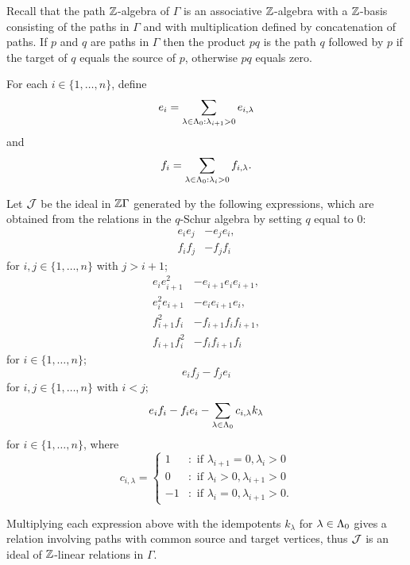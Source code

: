 \documentclass[a4paper, 11pt]{report}
\begin{document}
Recall that the path $\mathbb{Z}$-algebra of $\Gamma$ is an associative $\mathbb{Z}$-algebra with a $\mathbb{Z}$-basis consisting of the paths in $\Gamma$ and with multiplication defined by concatenation of paths. If $p$ and $q$ are paths in $\Gamma$ then the product $pq$ is the path $q$ followed by $p$ if the target of $q$ equals the source of $p$, otherwise $pq$ equals zero.

For each $i\in\{1,\ldots,n\}$, define
\begin{equation*}
e_i = \sum_{\lambda\in\Lambda_0{}:\lambda_{i+1}>0} e_{i,\lambda}
\end{equation*}
and
\begin{equation*}
f_i = \sum_{\lambda\in\Lambda_0{}:\lambda_i>0} f_{i,\lambda}.
\end{equation*}

Let $\mathcal{J}$ be the ideal in $\mathbb{Z}\Gamma$ generated by the following expressions, which are obtained from the relations in the $q$-Schur algebra by setting $q$ equal to $0$:
\begin{align*}
e_ie_j &- e_je_i,\\
f_if_j &- f_jf_i
\end{align*}
for $i,j\in\{1,\ldots,n\}$ with $j>i+1$;
\begin{align*}
e_i e_{i+1}^2 &- e_{i+1}e_ie_{i+1},\\
e_i^2e_{i+1} &- e_ie_{i+1}e_i,\\
f_{i+1}^2f_i &- f_{i+1}f_i f_{i+1},\\
f_{i+1}f_i^2 &- f_i f_{i+1} f_i
\end{align*}
for $i\in\{1,\ldots,n\}$;
\begin{equation*}
e_if_j -f_je_i
\end{equation*}
for $i,j\in\{1,\ldots,n\}$ with $i<j$;
\begin{equation*}
e_if_i - f_ie_i -\sum_{\lambda\in\Lambda_0{}}c_{i,\lambda}k_\lambda
\end{equation*}
for $i\in\{1,\ldots,n\}$, where
\begin{equation*}
c_{i,\lambda} = \begin{cases}
1 &:\text{ if } \lambda_{i+1}=0,\lambda_i>0\\
0 &:\text{ if } \lambda_i>0, \lambda_{i+1}>0\\
-1 &:\text{ if } \lambda_i=0, \lambda_{i+1}>0.
\end{cases}
\end{equation*}

Multiplying each expression above with the idempotents $k_\lambda$ for $\lambda\in\Lambda_0{}$ gives a relation involving paths with common source and target vertices, thus $\mathcal{J}$ is an ideal of $\mathbb{Z}$-linear relations in $\Gamma$.
\end{document}
